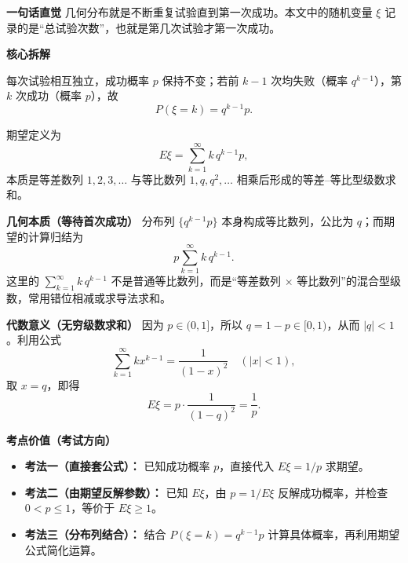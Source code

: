 \begin{explanationbox}
	\textbf{\textcolor{CExplanation}{一句话直觉}}
	几何分布就是不断重复试验直到第一次成功。本文中的随机变量 $\xi$ 记录的是“总试验次数”，也就是第几次试验才第一次成功。

	\medskip

	\textbf{\textcolor{CExplanation}{核心拆解}}

	\begin{description}[style=nextline, leftmargin=2.8em, labelsep=0.5em, itemsep=0.45em]
		\item[\textbf{要点一（概率模型）：}]
		      每次试验相互独立，成功概率 $p$ 保持不变；若前 $k-1$ 次均失败（概率 $q^{k-1}$），第 $k$ 次成功（概率 $p$），故
		      \[
			      P(\xi=k)=q^{k-1}p.
		      \]

		\item[\textbf{要点二（期望计算）：}]
		      期望定义为
		      \[
			      E\xi=\sum_{k=1}^\infty k\,q^{k-1}p,
		      \]
		      本质是等差数列 $1,2,3,\dots$ 与等比数列 $1,q,q^2,\dots$ 相乘后形成的等差--等比型级数求和。
	\end{description}

	\medskip

	\textbf{\textcolor{CExplanation}{几何本质（等待首次成功）}}
	分布列 $\{q^{k-1}p\}$ 本身构成等比数列，公比为 $q$；而期望的计算归结为
	\[
		p\sum_{k=1}^\infty k\,q^{k-1}.
	\]
	这里的 $\sum_{k=1}^\infty k\,q^{k-1}$ 不是普通等比数列，而是“等差数列 $\times$ 等比数列”的混合型级数，常用错位相减或求导法求和。

	\medskip

	\textbf{\textcolor{CExplanation}{代数意义（无穷级数求和）}}
	因为 $p\in(0,1]$，所以 $q=1-p\in[0,1)$，从而 $|q|<1$。利用公式
	\[
		\sum_{k=1}^\infty k x^{k-1} = \frac{1}{(1-x)^2}\quad (|x|<1),
	\]
	取 $x=q$，即得
	\[
		E\xi = p\cdot\frac{1}{(1-q)^2}=\frac{1}{p}.
	\]

	\medskip

	\textbf{\textcolor{CExplanation}{考点价值（考试方向）}}

	\begin{itemize}[leftmargin=*, itemsep=0.5em, topsep=0.4em]
		\item \textbf{考法一（直接套公式）：} 已知成功概率 $p$，直接代入 $E\xi=1/p$ 求期望。
		\item \textbf{考法二（由期望反解参数）：} 已知 $E\xi$，由 $p=1/E\xi$ 反解成功概率，并检查 $0<p\le1$，等价于 $E\xi\ge1$。
		\item \textbf{考法三（分布列结合）：} 结合 $P(\xi=k)=q^{k-1}p$ 计算具体概率，再利用期望公式简化运算。
	\end{itemize}


\end{explanationbox}
